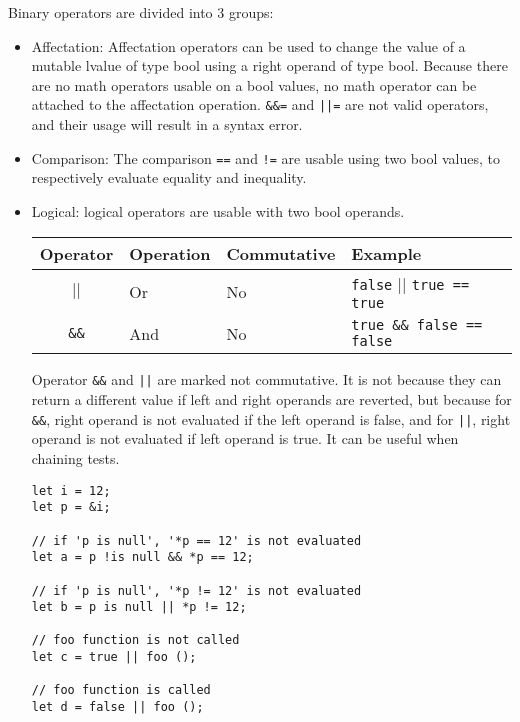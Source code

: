 Binary operators are divided into 3 groups:
\begin{itemize}
\item Affectation: Affectation operators can be used to change the value of a mutable lvalue of
  type bool using a right operand of type bool. Because there are no math
  operators usable on a bool values, no math operator can be attached to the
  affectation operation. \texttt{\&\&=} and \texttt{||=} are not valid operators, and their usage
  will result in a syntax error.

\item Comparison: The comparison \texttt{==} and \texttt{!=} are usable using
  two bool values, to respectively evaluate equality and inequality.

\item Logical: logical operators are usable with two bool operands.

  \begin{center}
    \vspace{-20pt}
    \begin{adjustbox}{max width=1.0\linewidth}
      \begin{tabular}{|c|l l l|}
        \hline
        Operator & Operation & Commutative & Example\\[0pt]
        \hline
        \hline
        \texttt{\(\vert\vert\)} & Or & No & \texttt{false} \(\vert{} \vert{}\) \texttt{true == true}\\[0pt]
        \texttt{\&\&} & And & No & \texttt{true \&\& false == false}\\[0pt]
        \hline
      \end{tabular}
    \end{adjustbox}
  \end{center}

  Operator \texttt{\&\&} and \texttt{||} are marked not commutative. It is not because they can
  return a different value if left and right operands are reverted, but because
  for \texttt{\&\&}, right operand is not evaluated if the left operand is false, and for
  \texttt{||}, right operand is not evaluated if left operand is true. It can be useful
  when chaining tests.

  \begin{lstlisting}[style=coloredverbatim]
let i = 12;
let p = &i;

// if 'p is null', '*p == 12' is not evaluated
let a = p !is null && *p == 12;

// if 'p is null', '*p != 12' is not evaluated
let b = p is null || *p != 12;

// foo function is not called
let c = true || foo ();

// foo function is called
let d = false || foo ();
  \end{lstlisting}
\end{itemize}

